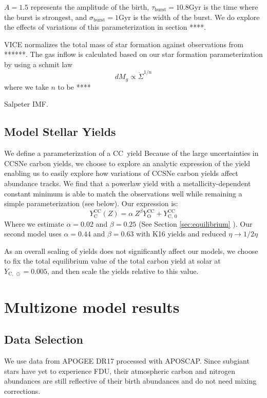 \documentclass[12pt,oneside]{book}
\newcommand{\sun}{\ensuremath{\odot}}
\begin{document}
$A=1.5$ represents the amplitude of the birth, $\tau_\text{burst}=10.8$Gyr is the time where the burst is strongest, and $\sigma_\text{burst}=1$Gyr is the width of the burst. We do explore the effects of variations of this parameterization in section ****.


VICE normalizes the total mass of star formation against observations from ******.
The gas inflow is calculated based on our star formation parameterization by using a schmit law 
\begin{equation}
    dM_g \propto \dot{\Sigma}^{1/n}
\end{equation}
where we take $n$ to be ****

Salpeter IMF.

\section{Model Stellar Yields}
We define a parameterization of a CC~yield
  Because of the large uncertainties in CCSNe carbon yields, we choose to explore an analytic expression of the yield enabling us to easily explore how variations of CCSNe carbon yields affect abundance tracks. We find that a powerlaw yield with a metallicity-dependent constant minimum is able to match the observations well while remaining a simple parameterization (see below). Our expression is:
  \begin{equation}\label{eq:y_yields}
   Y_\text{C}^\text{CC}(Z) =  \alpha\ Z^\beta Y_\text{O}^\text{CC} + Y_\text{C, 0}^\text{CC}
    \end{equation}
   	Where we estimate $\alpha = 0.02$ and $\beta = 0.25$ (See Section \ref{sec:equilibrium} ). Our second model uses $\alpha = 0.44$ and $\beta = 0.63$ with K16 yields and reduced $\eta \rightarrow 1/2 \eta$ 
    
    As an overall scaling of yields does not significantly affect our models, we choose to fix the total equilibrium value of the total carbon yield at solar at $Y_{\text{C},\ \sun} = 0.005$, and then scale the yields relative to this value. 

\chapter{Multizone model results}
\section{Data Selection}

We use data from APOGEE DR17 \citep{apogee17} processed with APOSCAP. Since subgiant stars have yet to experience FDU, their atmospheric carbon and nitrogen abundances are still reflective of their birth abundances and do not need mixing corrections. 
\end{document}
